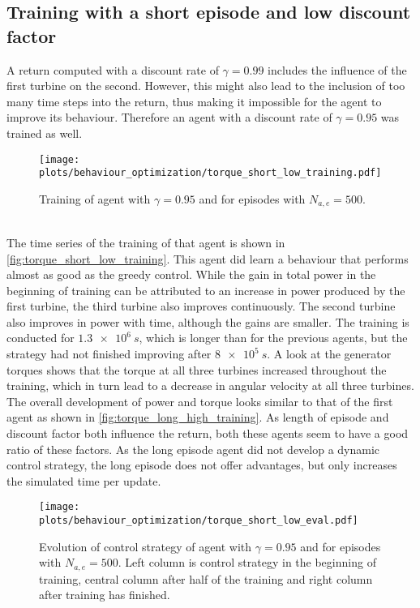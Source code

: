 \subsection{Training with a short episode and low discount factor}
A return computed with a discount rate of $\gamma=0.99$ includes the influence of the first turbine on the second. However, this might also lead to the inclusion of too many time steps into the return, thus making it impossible for the agent to improve its behaviour. Therefore an agent with a discount rate of $\gamma=0.95$ was trained as well.
\begin{figure}[h]
	\centering
	\texttt{[image: plots/behaviour\_optimization/torque\_short\_low\_training.pdf]}
	\caption{Training of agent with $\gamma=0.95$ and for episodes with $N_{a,e}=500$.}
	\label{fig:torque_short_low_training}
\end{figure} \\
The time series of the training of that agent is shown in \autoref{fig:torque_short_low_training}. This agent did learn a behaviour that performs almost as good as the greedy control. While the gain in total power in the beginning of training can be attributed to an increase in power produced by the first turbine, the third turbine also improves continuously. The second turbine also improves in power with time, although the gains are smaller. The training is conducted for $\SI{1.3e6}{s}$, which is longer than for the previous agents, but the strategy had not finished improving after $\SI{8e5}{s}$. A look at the generator torques shows that the torque at all three turbines increased throughout the training, which in turn lead to a decrease in angular velocity at all three turbines. The overall development of power and torque looks similar to that of the first agent as shown in \autoref{fig:torque_long_high_training}. As length of episode and discount factor both influence the return, both these agents seem to have a good ratio of these factors. As the long episode agent did not develop a dynamic control strategy, the long episode does not offer advantages, but only increases the simulated time per update. 
\begin{figure}[h]
	\centering
	\texttt{[image: plots/behaviour\_optimization/torque\_short\_low\_eval.pdf]}
	\caption{Evolution of control strategy of agent with $\gamma=0.95$ and for episodes with $N_{a,e}=500$. Left column is control strategy in the beginning of training, central column after half of the training and right column after training has finished.}
	\label{fig:torque_short_low_eval}
\end{figure} \\
